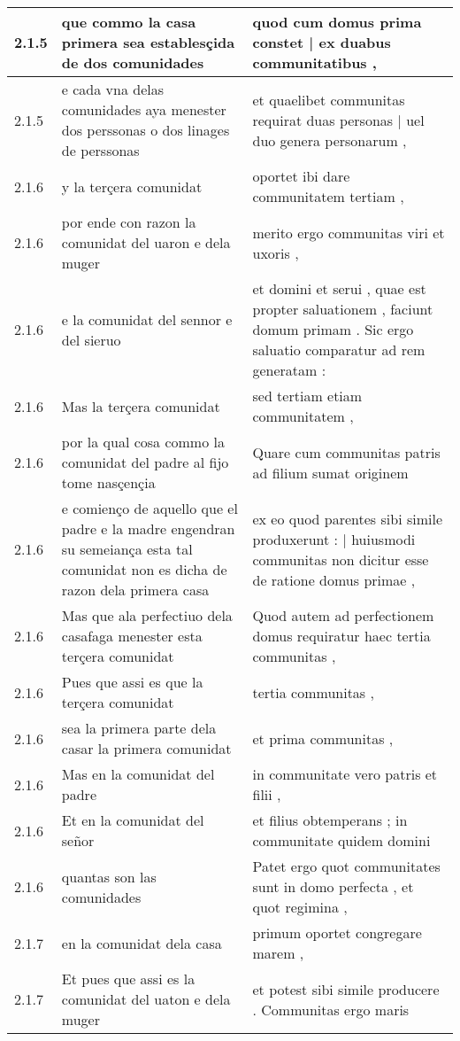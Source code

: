 \begin{tabular}{|p{1cm}|p{6.5cm}|p{6.5cm}|}
2.1.5 & que commo la casa primera sea establesçida de dos comunidades & quod cum domus prima constet | ex duabus communitatibus , \\\hline
2.1.5 & e cada vna delas comunidades aya menester dos perssonas o dos linages de perssonas & et quaelibet communitas requirat duas personas | uel duo genera personarum , \\\hline
2.1.6 & y la terçera comunidat & oportet ibi dare communitatem tertiam , \\\hline
2.1.6 & por ende con razon la comunidat del uaron e dela muger & merito ergo communitas viri et uxoris , \\\hline
2.1.6 & e la comunidat del sennor e del sieruo & et domini et serui , quae est propter saluationem , faciunt domum primam . Sic ergo saluatio comparatur ad rem generatam : \\\hline
2.1.6 & Mas la terçera comunidat & sed tertiam etiam communitatem , \\\hline
2.1.6 & por la qual cosa commo la comunidat del padre al fijo tome nasçençia & Quare cum communitas patris ad filium sumat originem \\\hline
2.1.6 & e comienço de aquello que el padre e la madre engendran su semeiança esta tal comunidat non es dicha de razon dela primera casa & ex eo quod parentes sibi simile produxerunt : | huiusmodi communitas non dicitur esse de ratione domus primae , \\\hline
2.1.6 & Mas que ala perfectiuo dela casafaga menester esta terçera comunidat & Quod autem ad perfectionem domus requiratur haec tertia communitas , \\\hline
2.1.6 & Pues que assi es que la terçera comunidat & tertia communitas , \\\hline
2.1.6 & sea la primera parte dela casar la primera comunidat & et prima communitas , \\\hline
2.1.6 & Mas en la comunidat del padre & in communitate vero patris et filii , \\\hline
2.1.6 & Et en la comunidat del señor & et filius obtemperans ; in communitate quidem domini \\\hline
2.1.6 & quantas son las comunidades & Patet ergo quot communitates sunt in domo perfecta , et quot regimina , \\\hline
2.1.7 & en la comunidat dela casa & primum oportet congregare marem , \\\hline
2.1.7 & Et pues que assi es la comunidat del uaton e dela muger & et potest sibi simile producere . Communitas ergo maris \\\hline

\end{tabular}
